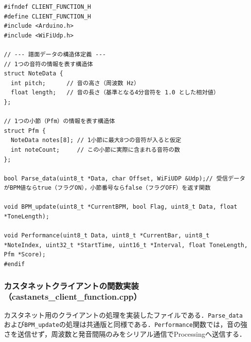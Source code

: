 \begin{lstlisting}
#ifndef CLIENT_FUNCTION_H
#define CLIENT_FUNCTION_H
#include <Arduino.h>
#include <WiFiUdp.h>

// --- 譜面データの構造体定義 ---
// 1つの音符の情報を表す構造体
struct NoteData {
  int pitch;      // 音の高さ（周波数 Hz）
  float length;   // 音の長さ（基準となる4分音符を 1.0 とした相対値）
};

// 1つの小節（Pfm）の情報を表す構造体
struct Pfm {
  NoteData notes[8]; // 1小節に最大8つの音符が入ると仮定
  int noteCount;     // この小節に実際に含まれる音符の数
};

bool Parse_data(uint8_t *Data, char Offset, WiFiUDP &Udp);// 受信データがBPM値ならtrue（フラグON），小節番号ならfalse（フラグOFF）を返す関数

void BPM_update(uint8_t *CurrentBPM, bool Flag, uint8_t Data, float *ToneLength);

void Performance(uint8_t Data, uint8_t *CurrentBar, uint8_t *NoteIndex, uint32_t *StartTime, uint16_t *Interval, float ToneLength, Pfm *Score);
#endif
\end{lstlisting}

\subsubsection{カスタネットクライアントの関数実装（castanets\_client\_function.cpp）}
カスタネット用のクライアントの処理を実装したファイルである．\texttt{Parse\_data}および\texttt{BPM\_update}の処理は共通版と同様である．\texttt{Performance}関数では，音の強さを送信せず，周波数と発音間隔のみをシリアル通信でProcessingへ送信する．

